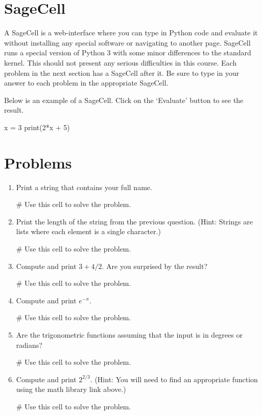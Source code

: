 \documentclass{ximera}
\begin{document}
\section{SageCell}

A SageCell is a web-interface where you can type in Python code and evaluate it without installing any special software or navigating to another page. SageCell runs a special version of Python 3 with some minor differences to the standard kernel. This should not present any serious difficulties in this course. Each problem in the next section has a SageCell after it. Be sure to type in your answer to each problem in the appropriate SageCell.

Below is an example of a SageCell. Click on the `Evaluate' button to see the result.

\begin{sageCell}
x = 3
print(2*x + 5)
\end{sageCell}

\section{Problems}
\begin{enumerate}
    \item Print a string that contains your full name.
\begin{sageCell}
# Use this cell to solve the problem.
\end{sageCell}

    \item Print the length of the string from the previous question. (Hint: Strings are lists where each element is a single character.)
\begin{sageCell}
# Use this cell to solve the problem.
\end{sageCell}

    \item Compute and print $3+4/2$. Are you surprised by the result?
\begin{sageCell}
# Use this cell to solve the problem.
\end{sageCell}

    \item Compute and print $e^{-\pi}$.
\begin{sageCell}
# Use this cell to solve the problem.
\end{sageCell}

    \item Are the trigonometric functions assuming that the input is in degrees or radians?
\begin{sageCell}
# Use this cell to solve the problem.
\end{sageCell}

    \item Compute and print $2^{2/3}$. (Hint: You will need to find an appropriate function using the math library link above.)
\begin{sageCell}
# Use this cell to solve the problem.
\end{sageCell}

\end{enumerate}
\end{document}
